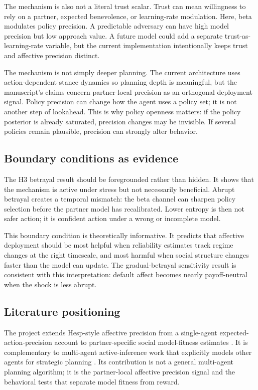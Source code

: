 The mechanism is also not a literal trust scalar. Trust can mean willingness to rely on a partner, expected benevolence, or learning-rate modulation. Here, beta modulates policy precision. A predictable adversary can have high model precision but low approach value. A future model could add a separate trust-as-learning-rate variable, but the current implementation intentionally keeps trust and affective precision distinct.

The mechanism is not simply deeper planning. The current architecture uses action-dependent stance dynamics so planning depth is meaningful, but the manuscript's claims concern partner-local precision as an orthogonal deployment signal. Policy precision can change how the agent uses a policy set; it is not another step of lookahead. This is why policy openness matters: if the policy posterior is already saturated, precision changes may be invisible. If several policies remain plausible, precision can strongly alter behavior.

\subsection{Boundary conditions as evidence}

The H3 betrayal result should be foregrounded rather than hidden. It shows that the mechanism is active under stress but not necessarily beneficial. Abrupt betrayal creates a temporal mismatch: the beta channel can sharpen policy selection before the partner model has recalibrated. Lower entropy is then not safer action; it is confident action under a wrong or incomplete model.

This boundary condition is theoretically informative. It predicts that affective deployment should be most helpful when reliability estimates track regime changes at the right timescale, and most harmful when social structure changes faster than the model can update. The gradual-betrayal sensitivity result is consistent with this interpretation: default affect becomes nearly payoff-neutral when the shock is less abrupt.

\subsection{Literature positioning}

The project extends Hesp-style affective precision from a single-agent expected-action-precision account to partner-specific social model-fitness estimates . It is complementary to multi-agent active-inference work that explicitly models other agents for strategic planning . Its contribution is not a general multi-agent planning algorithm; it is the partner-local affective precision signal and the behavioral tests that separate model fitness from reward.

